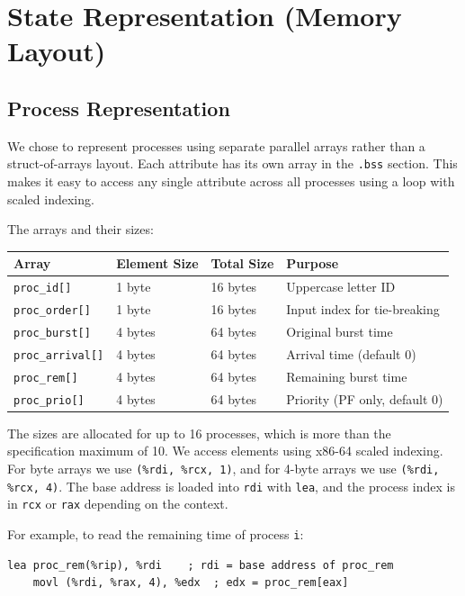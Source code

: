 \documentclass[a4paper,12pt]{article}
\begin{document}
\section{State Representation (Memory Layout)}

\subsection{Process Representation}

We chose to represent processes using separate parallel arrays rather than a struct-of-arrays layout. Each attribute has its own array in the \texttt{.bss} section. This makes it easy to access any single attribute across all processes using a loop with scaled indexing.

The arrays and their sizes:

\begin{center}
\begin{tabular}{|l|l|l|l|}
\hline
\textbf{Array} & \textbf{Element Size} & \textbf{Total Size} & \textbf{Purpose} \\
\hline
\texttt{proc\_id[]} & 1 byte & 16 bytes & Uppercase letter ID \\
\texttt{proc\_order[]} & 1 byte & 16 bytes & Input index for tie-breaking \\
\texttt{proc\_burst[]} & 4 bytes & 64 bytes & Original burst time \\
\texttt{proc\_arrival[]} & 4 bytes & 64 bytes & Arrival time (default 0) \\
\texttt{proc\_rem[]} & 4 bytes & 64 bytes & Remaining burst time \\
\texttt{proc\_prio[]} & 4 bytes & 64 bytes & Priority (PF only, default 0) \\
\hline
\end{tabular}
\end{center}

The sizes are allocated for up to 16 processes, which is more than the specification maximum of 10. We access elements using x86-64 scaled indexing. For byte arrays we use \texttt{(\%rdi, \%rcx, 1)}, and for 4-byte arrays we use \texttt{(\%rdi, \%rcx, 4)}. The base address is loaded into \texttt{rdi} with \texttt{lea}, and the process index is in \texttt{rcx} or \texttt{rax} depending on the context.

For example, to read the remaining time of process \texttt{i}:

\begin{lstlisting}[style=AsmStyle]
    lea proc_rem(%rip), %rdi    ; rdi = base address of proc_rem
    movl (%rdi, %rax, 4), %edx  ; edx = proc_rem[eax]
\end{lstlisting}
\end{document}
